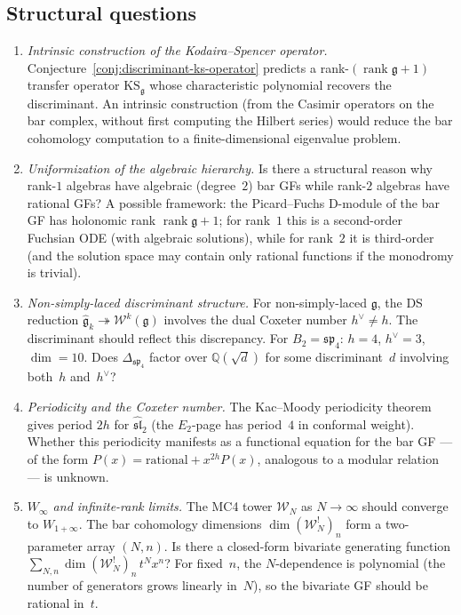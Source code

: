 \subsection{Structural questions}

\begin{enumerate}[label=\textbf{LR-\arabic*.}, leftmargin=3em]
\item \emph{Intrinsic construction of the Kodaira--Spencer operator.}
Conjecture~\ref{conj:discriminant-ks-operator} predicts a rank-$(\operatorname{rank}\mathfrak{g}+1)$ transfer operator $\mathrm{KS}_{\mathfrak{g}}$ whose characteristic polynomial recovers the discriminant.  An intrinsic construction (from the Casimir operators on the bar complex, without first computing the Hilbert series) would reduce the bar cohomology computation to a finite-dimensional eigenvalue problem.

\item \emph{Uniformization of the algebraic hierarchy.}
Is there a structural reason why rank-$1$ algebras have algebraic (degree~$2$) bar GFs while rank-$2$ algebras have rational GFs?  A possible framework: the Picard--Fuchs D-module of the bar GF has holonomic rank $\operatorname{rank}\mathfrak{g} + 1$; for rank~$1$ this is a second-order Fuchsian ODE (with algebraic solutions), while for rank~$2$ it is third-order (and the solution space may contain only rational functions if the monodromy is trivial).

\item \emph{Non-simply-laced discriminant structure.}
For non-simply-laced $\mathfrak{g}$, the DS reduction $\widehat{\mathfrak{g}}_k \twoheadrightarrow \mathcal{W}^k(\mathfrak{g})$ involves the dual Coxeter number $h^\vee \neq h$.  The discriminant should reflect this discrepancy.  For $B_2 = \mathfrak{sp}_4$: $h = 4$, $h^\vee = 3$, $\dim = 10$.  Does $\Delta_{\mathfrak{sp}_4}$ factor over $\mathbb{Q}(\sqrt{d})$ for some discriminant~$d$ involving both~$h$ and~$h^\vee$?

\item \emph{Periodicity and the Coxeter number.}
The Kac--Moody periodicity theorem gives period $2h$ for $\widehat{\mathfrak{sl}}_2$ (the $E_2$-page has period~$4$ in conformal weight).  Whether this periodicity manifests as a functional equation for the bar GF --- of the form $P(x) = \text{rational} + x^{2h} P(x)$, analogous to a modular relation --- is unknown.

\item \emph{$W_\infty$ and infinite-rank limits.}
The MC4 tower $\mathcal{W}_N$ as $N \to \infty$ should converge to $W_{1+\infty}$.  The bar cohomology dimensions $\dim(\mathcal{W}_N^!)_n$ form a two-parameter array $(N, n)$.  Is there a closed-form bivariate generating function $\sum_{N,n} \dim(\mathcal{W}_N^!)_n\, t^N x^n$?  For fixed~$n$, the $N$-dependence is polynomial (the number of generators grows linearly in~$N$), so the bivariate GF should be rational in~$t$.
\end{enumerate}


